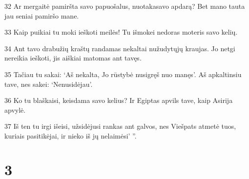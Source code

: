 \par 32 Ar mergaitė pamiršta savo papuošalus, nuotaka­savo apdarą? Bet mano tauta jau seniai pamiršo mane. 
\par 33 Kaip puikiai tu moki ieškoti meilės! Tu išmokei nedoras moteris savo kelių. 
\par 34 Ant tavo drabužių kraštų randamas nekaltai nužudytųjų kraujas. Jo netgi nereikia ieškoti, jis aiškiai matomas ant tavęs. 
\par 35 Tačiau tu sakai: ‘Aš nekalta, Jo rūstybė nusigręš nuo manęs’. Aš apkaltinsiu tave, nes sakei: ‘Nenusidėjau’. 
\par 36 Ko tu blaškaisi, keisdama savo kelius? Ir Egiptas apvils tave, kaip Asirija apvylė. 
\par 37 Iš ten tu irgi išeisi, užsidėjusi rankas ant galvos, nes Viešpats atmetė tuos, kuriais pasitikėjai, ir nieko iš jų nelaimėsi’ ”.



\chapter{3}


